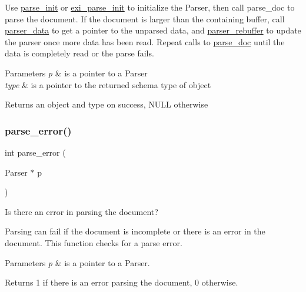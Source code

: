 Use \hyperlink{group__parse_gad28bad9bf84823a7c937a544a462db55}{parse\+\_\+init} or \hyperlink{group__parse_ga69faec40afb94556fb457d8a94db7eed}{exi\+\_\+parse\+\_\+init} to initialize the Parser, then call parse\+\_\+doc to parse the document. If the document is larger than the containing buffer, call \hyperlink{group__parse_gaaafb364e4f9991b31ed7653e936f3806}{parser\+\_\+data} to get a pointer to the unparsed data, and \hyperlink{group__parse_gad168a73b5bc04a6a128f4c8756abf080}{parser\+\_\+rebuffer} to update the parser once more data has been read. Repeat calls to \hyperlink{group__parse_gaa8a34fd82dce1d5e2930cb6b9c6213ae}{parse\+\_\+doc} until the data is completely read or the parse fails. 
\begin{DoxyParams}{Parameters}
{\em p} & is a pointer to a Parser \\
\hline
{\em type} & is a pointer to the returned schema type of object \\
\hline
\end{DoxyParams}
\begin{DoxyReturn}{Returns}
an object and type on success, N\+U\+LL otherwise 
\end{DoxyReturn}
\mbox{\label{group__parse_gafe03ba10b14b1ef18f300a2903fa6fda}} 
\subsubsection{\texorpdfstring{parse\+\_\+error()}{parse\_error()}}
{\footnotesize\ttfamily int parse\+\_\+error (\begin{DoxyParamCaption}\item[{Parser $\ast$}]{p }\end{DoxyParamCaption})}



Is there an error in parsing the document? 

Parsing can fail if the document is incomplete or there is an error in the document. This function checks for a parse error. 
\begin{DoxyParams}{Parameters}
{\em p} & is a pointer to a Parser. \\
\hline
\end{DoxyParams}
\begin{DoxyReturn}{Returns}
1 if there is an error parsing the document, 0 otherwise. 
\end{DoxyReturn}
\mbox{\label{group__parse_gad28bad9bf84823a7c937a544a462db55}} 

